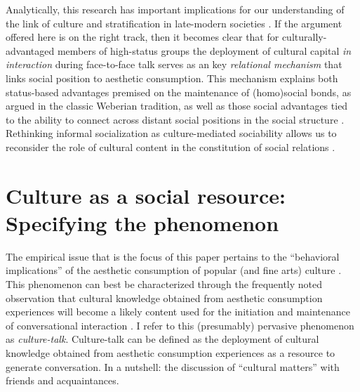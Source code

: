 \documentclass[11pt]{article}
\begin{document}
Analytically, this research has important implications for our understanding of the link of culture and stratification in late-modern societies \citep{ollivier00}.  If the argument offered here is on the right track, then it becomes clear that for culturally-advantaged members of high-status groups the deployment of cultural capital \emph{in interaction} \citep{eliasoph_lichterman03} during face-to-face talk serves as an key \emph{relational mechanism} \citep{tilly98} that links social position to aesthetic consumption.  This mechanism explains both status-based advantages premised on the maintenance of (homo)social bonds, as argued in the classic Weberian tradition, as well as those social advantages tied to the ability to connect across distant social positions in the social structure \citep{erickson96, lizardo06a, lin99, pachuki_breiger10}.   Rethinking informal socialization as culture-mediated sociability allows us to reconsider the role of cultural content in the constitution of social relations \citep{ikegami05, mische03, mische10}.  

\section{Culture as a social resource:  Specifying the phenomenon}
The empirical issue that is the focus of this paper pertains to the ``behavioral implications'' of the aesthetic consumption of popular (and fine arts) culture \citep{fine77}.  This phenomenon can best be characterized through the frequently noted observation that cultural knowledge obtained from aesthetic consumption experiences will become a likely content used for the initiation and maintenance of conversational interaction \citep{dimaggio87, collins75}.  I refer to this (presumably) pervasive phenomenon as \emph{culture-talk}.  Culture-talk can be defined as the deployment of cultural knowledge obtained from aesthetic consumption experiences as a resource to generate conversation.  In a nutshell:  the discussion of ``cultural matters'' with friends and acquaintances.
\end{document}
